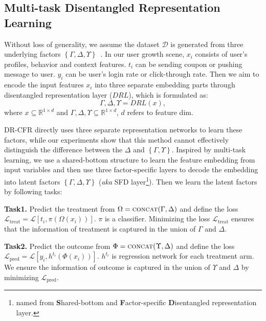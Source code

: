 \documentclass[sigconf]{acmart}
\begin{document}
\subsection{Multi-task Disentangled Representation Learning}
Without loss of generality, we assume the dataset $\mathcal{D}$ is generated from three underlying factors $\left \{ \Gamma,\Delta,\Upsilon \right \}$~\citep{Hassanpour2020LearningDR}. In our user growth scene, $x_{i}$ consists of user’s profiles, behavior and context features. $t_{i}$ can be sending coupon or pushing message to user. $y_{i}$ can be user’s login rate or click-through rate. Then we aim to encode the input features $x_{i}$ into three separate embedding parts through disentangled representation layer ($DRL$), which is formulated as:
\begin{equation}
\Gamma,\Delta,\Upsilon = DRL(x),
\end{equation}
where $x \subseteq \mathbb{R}^{1 \times d}$ and $\Gamma,\Delta,\Upsilon \subseteq \mathbb{R}^{1 \times d}$, $d$ refers to feature dim. \par
DR-CFR directly uses three separate representation networks to learn these factors, while our experiments show that this method cannot effectively distinguish the difference between the $\Delta$ and $\left \{ \Gamma,\Upsilon \right \}$. Inspired by multi-task learning, we use a shared-bottom structure to learn the feature embedding from input variables and then use three factor-specific layers to decode the embedding into latent factors $\left \{ \Gamma,\Delta,\Upsilon \right \}$ (\textit{aka} SFD layer\footnote{named from \textbf{S}hared-bottom and \textbf{F}actor-specific \textbf{D}isentangled representation layer.}). Then we learn the latent factors by following tasks:\par
\textbf{Task1.} Predict the treatment from $\Omega=\textsc{concat}(\Gamma,\Delta)$ and define the loss $\mathcal{L}_{\text{treat}}=\mathcal{L}[t_{i}, \pi(\Omega(x_{i}))]$. $\pi$ is a classifier. Minimizing the loss $\mathcal{L}_{\text{treat}}$ ensures that the information of treatment is captured in the union of $\Gamma$ and $\Delta$.\par
\textbf{Task2.} Predict the outcome from $\Phi=\textsc{concat}(\Upsilon,\Delta)$ and define the loss $\mathcal{L}_{\text{pred}}=\mathcal{L}[y_{i}, h^{t_{i}}(\Phi(x_{i}))]$. $h^{t_{i}}$ is regression network for each treatment arm. We ensure the information of outcome is captured in the union of $\Upsilon$ and $\Delta$ by minimizing $\mathcal{L}_{\text{pred}}$.\par
\end{document}
